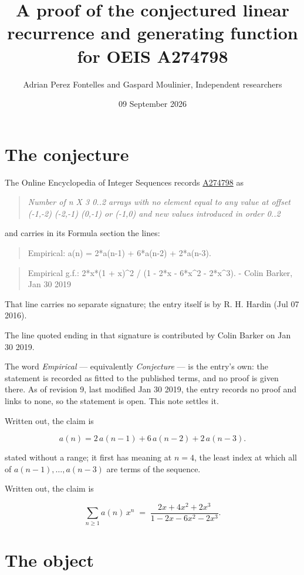 \documentclass[11pt]{article}
\title{A proof of the conjectured linear recurrence and generating function for OEIS A274798}
\author{Adrian Perez Fontelles and Gaspard Moulinier, Independent researchers}
\date{09 September 2026}
\theoremstyle{definition}
\begin{document}
\maketitle
\section{The conjecture}

The Online Encyclopedia of Integer Sequences records \href{https://oeis.org/A274798}{A274798} as

\begin{quote}\itshape Number of n X 3 0..2 arrays with no element equal to any value at offset (-1,-2) (-2,-1) (0,-1) or (-1,0) and new values introduced in order 0..2\end{quote}

and carries in its Formula section the lines:

\begin{quote}\ttfamily Empirical: a(n) = 2*a(n-1) + 6*a(n-2) + 2*a(n-3).\end{quote}

\begin{quote}\ttfamily Empirical g.f.: 2*x*(1 + x)\textasciicircum{}2 / (1 - 2*x - 6*x\textasciicircum{}2 - 2*x\textasciicircum{}3). - Colin Barker, Jan 30 2019\end{quote}

That line carries no separate signature; the entry itself is by R. H. Hardin (Jul 07 2016).

The line quoted ending in that signature is contributed by Colin Barker on Jan 30 2019.

The word {\itshape Empirical} --- equivalently {\itshape Conjecture} --- is the entry's own: the statement is recorded as fitted to the published terms, and no proof is given there. As of revision 9, last modified Jan 30 2019, the entry records no proof and links to none, so the statement is open. This note settles it.

Written out, the claim is

\[a(n) = 2\,a(n-1) + 6\,a(n-2) + 2\,a(n-3).\]

stated without a range; it first has meaning at $n = 4$, the least index at which all of $a(n-1),\dots,a(n-3)$ are terms of the sequence.

Written out, the claim is

\[\sum_{n \ge 1} a(n)\,x^n \;=\; \frac{2x + 4x^{2} + 2x^{3}}{1 - 2x - 6x^{2} - 2x^{3}}.\]

\section{The object}
\end{document}
